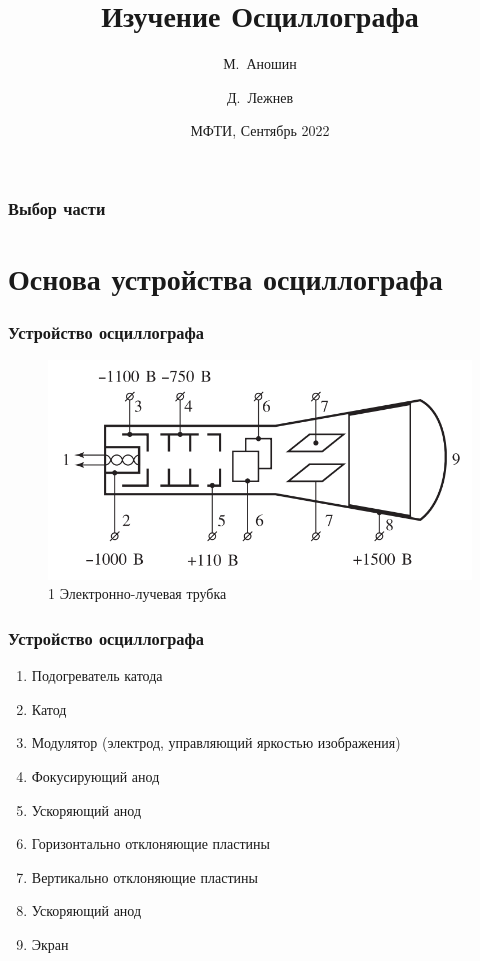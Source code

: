 \documentclass[xcolor=table]{beamer}
\title[Осциллограф] %
{Изучение Осциллографа}
\author[Аношин М, Б04-203] %
{М.~Аношин\inst{1} \and Д.~Лежнев\inst{2}}
\date[14.09.2022] %
{МФТИ, Сентябрь 2022}
\begin{document}
\frame{\titlepage}


\begin{frame}
\frametitle{Выбор части}
\tableofcontents
\end{frame}


%
%

\section{Основа устройства осциллографа}

\begin{frame}
\frametitle{Устройство осциллографа}
\begin{figure}
    \centering
    \includegraphics[scale=0.3]{image.png}
    \caption{1 Электронно-лучевая трубка}
    \label{fig:my_label}
\end{figure}
\end{frame}

\begin{frame}
\frametitle{Устройство осциллографа}
\begin{enumerate}
    \item Подогреватель катода
    \item Катод
    \item Модулятор (электрод, управляющий яркостью изображения)
    \item Фокусирующий анод
    \item Ускоряющий анод 
    \item Горизонтально отклоняющие пластины 
    \item Вертикально отклоняющие пластины
    \item Ускоряющий анод
    \item Экран
\end{enumerate}
\end{frame}
\end{document}
